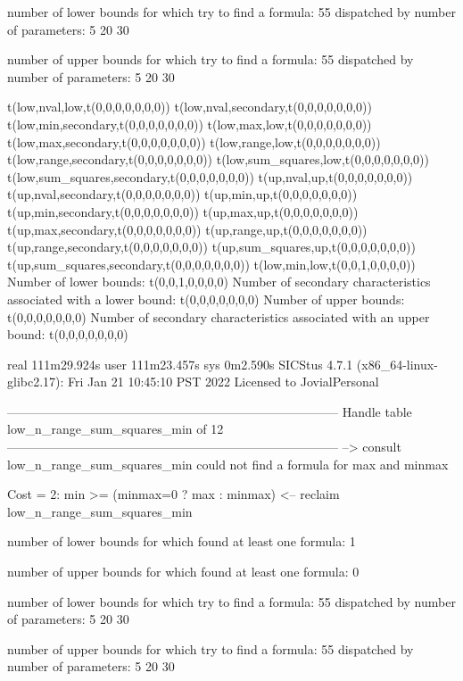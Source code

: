 number of lower bounds for which try to find a formula: 55
dispatched by number of parameters: 5  20  30

number of upper bounds for which try to find a formula: 55
dispatched by number of parameters: 5  20  30

t(low,nval,low,t(0,0,0,0,0,0,0))
t(low,nval,secondary,t(0,0,0,0,0,0,0))
t(low,min,secondary,t(0,0,0,0,0,0,0))
t(low,max,low,t(0,0,0,0,0,0,0))
t(low,max,secondary,t(0,0,0,0,0,0,0))
t(low,range,low,t(0,0,0,0,0,0,0))
t(low,range,secondary,t(0,0,0,0,0,0,0))
t(low,sum_squares,low,t(0,0,0,0,0,0,0))
t(low,sum_squares,secondary,t(0,0,0,0,0,0,0))
t(up,nval,up,t(0,0,0,0,0,0,0))
t(up,nval,secondary,t(0,0,0,0,0,0,0))
t(up,min,up,t(0,0,0,0,0,0,0))
t(up,min,secondary,t(0,0,0,0,0,0,0))
t(up,max,up,t(0,0,0,0,0,0,0))
t(up,max,secondary,t(0,0,0,0,0,0,0))
t(up,range,up,t(0,0,0,0,0,0,0))
t(up,range,secondary,t(0,0,0,0,0,0,0))
t(up,sum_squares,up,t(0,0,0,0,0,0,0))
t(up,sum_squares,secondary,t(0,0,0,0,0,0,0))
t(low,min,low,t(0,0,1,0,0,0,0))
Number of lower bounds:                                             t(0,0,1,0,0,0,0)
Number of secondary characteristics associated with a lower bound:  t(0,0,0,0,0,0,0)
Number of upper bounds:                                             t(0,0,0,0,0,0,0)
Number of secondary characteristics associated with an upper bound: t(0,0,0,0,0,0,0)

real	111m29.924s
user	111m23.457s
sys	0m2.590s
SICStus 4.7.1 (x86_64-linux-glibc2.17): Fri Jan 21 10:45:10 PST 2022
Licensed to JovialPersonal


--------------------------------------------------------------------------------
Handle table low_n_range_sum_squares_min of 12
--------------------------------------------------------------------------------
--> consult low_n_range_sum_squares_min
could not find a formula for max and minmax

Cost =  2:  min >= (minmax=0 ? max : minmax)
<-- reclaim low_n_range_sum_squares_min

number of lower bounds for which found at least one formula: 1

number of upper bounds for which found at least one formula: 0

number of lower bounds for which try to find a formula: 55
dispatched by number of parameters: 5  20  30

number of upper bounds for which try to find a formula: 55
dispatched by number of parameters: 5  20  30

